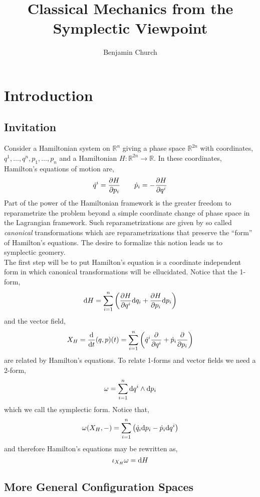 \documentclass[12pt]{extarticle}
\newcommand{\R}{\mathbb{R}}
\begin{document}
\author{Benjamin Church}
\title{\Huge Classical Mechanics from the Symplectic Viewpoint}

\maketitle
\tableofcontents
\newpage

\section{Introduction}

\subsection{Invitation}

Consider a Hamiltonian system on $\R^n$ giving a phase space $\R^{2n}$ with coordinates, $q^1, \dots, q^n, p_1, \dots, p_n$ and a Hamiltonian $H : \R^{2n} \to \R$. In these coordinates, Hamilton's equations of motion are,
\[ \dot{q}^i = \frac{\partial{H}}{\partial{p_i}} \quad \quad \dot{p}_i = - \frac{\partial{H}}{\partial{q^i}} \]
Part of the power of the Hamiltonian framework is the greater freedom to reparametrize the problem beyond a simple coordinate change of phase space in the Lagrangian framework. Such reparametrizations are given by so called \textit{canonical} transformations which are reparametrizations that preserve the ``form'' of Hamilton's equations. The desire to formalize this notion leads us to symplectic geomery.
\bigskip\\
The first step will be to put Hamilton's equation is a coordinate independent form in which canonical transformations will be ellucidated. Notice that the 1-form,
\[ \mathrm{d}{H} = \sum_{i = 1}^n \left( \frac{\partial{H}}{\partial{q^i}} \mathrm{d}{q_i} + \frac{\partial{H}}{\partial{p_i}} \mathrm{d}{p_i} \right) \]
and the vector field,
\[ X_H = \frac{\mathrm{d}{}}{\mathrm{d}{t}} (q,p)(t) = \sum_{i = 1}^n \left( \dot{q}^i \frac{\partial{}}{\partial{q^i}} + \dot{p}_i \frac{\partial{}}{\partial{p_i}} \right) \]
are related by Hamilton's equations. To relate 1-forms and vector fields we need a 2-form,
\[ \omega = \sum_{i = 1}^n \mathrm{d}{q^i} \wedge \mathrm{d}{p_i} \]
which we call the symplectic form. Notice that,
\[ \omega(X_H, -) = \sum_{i = 1}^n \left( \dot{q}_i \mathrm{d}{p_i} - \dot{p}_i \mathrm{d}{q^i} \right) \]
and therefore Hamilton's equations may be rewritten as,
\[ \iota_{X_H} \omega = \mathrm{d}{H} \]


\subsection{More General Configuration Spaces}
\end{document}
